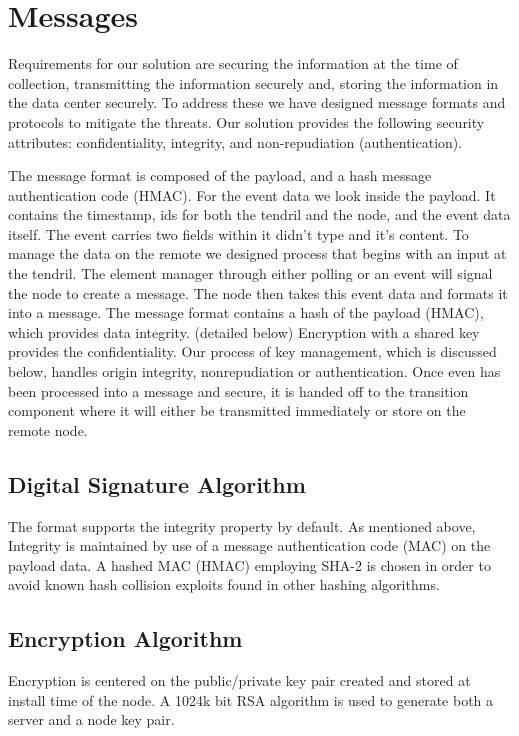 \section{Messages}
Requirements for our solution are securing the information at the time of collection, transmitting the information securely and, storing the information in the data center securely. To address these we have designed message formats and protocols to mitigate the threats. Our solution provides the following security attributes:  confidentiality, integrity, and non-repudiation (authentication). 

The message format is composed of the payload, and a hash message authentication code (HMAC). For the event data we look inside the payload. It contains the timestamp, ids for both the tendril and the node, and the event data itself. The event carries two fields within it didn’t type and it’s content.  To manage the data on the remote we designed process that begins with an input at the tendril. The element manager through either polling or an event will signal the node to create a message. The node then takes this event data and formats it into a message. The message format contains a hash of the payload (HMAC), which provides data integrity. (detailed below) Encryption with a shared key provides the confidentiality. Our process of key management, which is discussed below, handles origin integrity, nonrepudiation or authentication.   Once even has been processed into a message and secure, it is handed off to the transition component where it will either be transmitted immediately or store on the remote node.

\subsection{Digital Signature Algorithm}
The format supports the integrity property by default. As mentioned above, Integrity is maintained by use of a message authentication code (MAC) on the payload data. A hashed MAC (HMAC) employing SHA-2 is chosen in order to avoid known hash collision exploits found in other hashing algorithms. \cite{Turner:MiRyW-r_} 

\subsection{Encryption Algorithm}
Encryption is centered on the public/private key pair created and stored at install time of the node. A 1024k bit RSA algorithm is used to generate both a server and a node key pair. 

